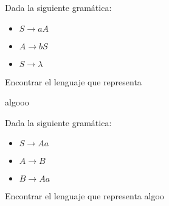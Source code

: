 \begin{problem}
Dada la siguiente gramática:
\begin{itemize}
\item $S \rightarrow aA$
\item $A \rightarrow bS$
\item $S \rightarrow \lambda$
\end{itemize}
 Encontrar el lenguaje que representa
 \solution
 
 algooo
\end{problem}

\begin{problem}
 Dada la siguiente gramática:
\begin{itemize}
\item $S \rightarrow Aa$
\item $A \rightarrow B$
\item $B \rightarrow Aa$
\end{itemize}
 Encontrar el lenguaje que representa
\solution
algoo

\end{problem}